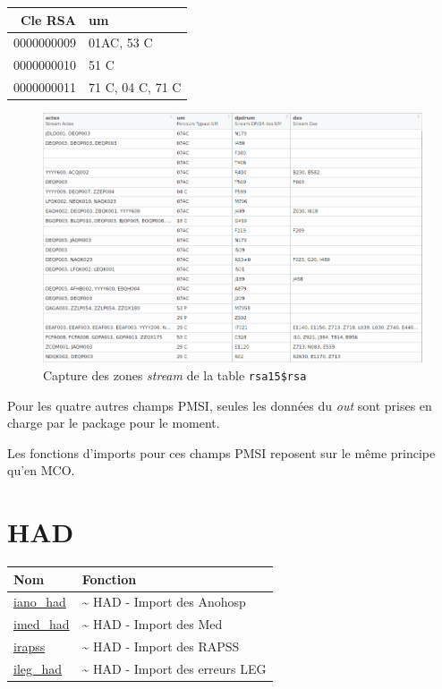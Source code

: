 \documentclass[
]{book}
\begin{document}
\begin{longtable}[]{@{}rl@{}}
\toprule
Cle RSA & um \\
\midrule
\endhead
0000000009 & 01AC, 53 C \\
0000000010 & 51 C \\
0000000011 & 71 C, 04 C, 71 C \\
\bottomrule
\end{longtable}

\begin{figure}
\centering
\includegraphics{images/rsa_stream.png}
\caption{Capture des zones \emph{stream} de la table \texttt{rsa15\$rsa}}
\end{figure}

Pour les quatre autres champs PMSI, seules les données du \emph{out} sont prises en charge par le package pour le moment.

Les fonctions d'imports pour ces champs PMSI reposent sur le même principe qu'en MCO.

\hypertarget{had}{%
\section{HAD}\label{had}}

\begin{longtable}[]{@{}ll@{}}
\toprule
Nom & Fonction \\
\midrule
\endhead
\href{https://guillaumepressiat.github.io/pmeasyr/reference/iano_had.html}{iano\_had} & \textasciitilde{} HAD - Import des Anohosp \\
\href{https://guillaumepressiat.github.io/pmeasyr/reference/imed_had.html}{imed\_had} & \textasciitilde{} HAD - Import des Med \\
\href{https://guillaumepressiat.github.io/pmeasyr/reference/irapss.html}{irapss} & \textasciitilde{} HAD - Import des RAPSS \\
\href{https://guillaumepressiat.github.io/pmeasyr/reference/ileg_had.html}{ileg\_had} & \textasciitilde{} HAD - Import des erreurs LEG \\
\bottomrule
\end{longtable}
\end{document}

